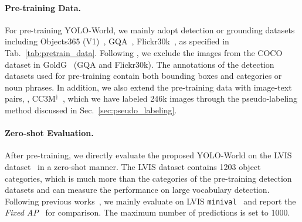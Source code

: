 \documentclass[10pt,twocolumn,letterpaper]{article}
\newcommand{\name}{YOLO-World}
\begin{document}
\paragraph{Pre-training Data.}
For pre-training \name{}, we mainly adopt detection or grounding datasets including Objects365 (V1)~\cite{Shao2019Objects365AL}, GQA~\cite{GQA}, Flickr30k~\cite{Flickr}, as specified in Tab.~\ref{tab:pretrain_data}.
Following \cite{GLIP}, we exclude the images from the COCO dataset in GoldG~\cite{mdetr} (GQA and Flickr30k).
The annotations of the detection datasets used for pre-training contain both bounding boxes and categories or noun phrases.
In addition, we also extend the pre-training data with image-text pairs, \ie, CC3M$^{\dagger}$~\cite{CC3M}, which we have labeled 246k images through the pseudo-labeling method discussed in Sec.~\ref{sec:pseudo_labeling}.

\begin{table}
    \centering
    \renewcommand\arraystretch{1.2}
    \caption{\textbf{Pre-training Data.} The specifications of the datasets used for pre-training \name{}.}
    \vspace{-10pt}
    \label{tab:pretrain_data}
\end{table}

\paragraph{Zero-shot Evaluation.}
After pre-training, we directly evaluate the proposed \name{} on the LVIS dataset~\cite{LVIS} in a zero-shot manner.
The LVIS dataset contains 1203 object categories, which is much more than the categories of the pre-training detection datasets and can measure the performance on large vocabulary detection.
Following previous works~\cite{mdetr,GLIP,DetCLIP,DetCLIPv2}, we mainly evaluate on LVIS \texttt{minival}~\cite{mdetr} and report the \textit{Fixed AP}~\cite{largevocabdevil} for comparison. The maximum number of predictions is set to 1000.
\end{document}
